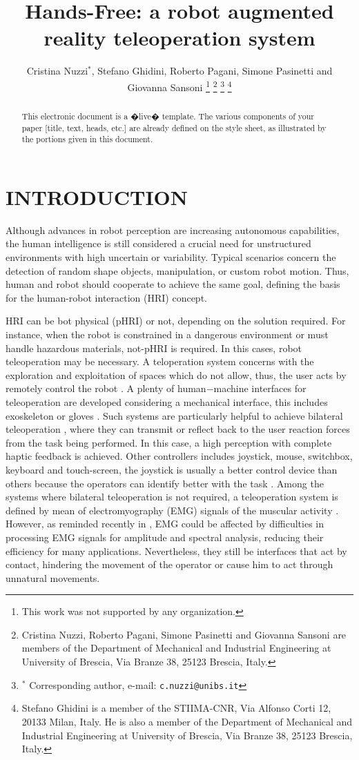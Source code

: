 \documentclass[letterpaper, 10 pt, conference]{ieeeconf}  %
\title{\LARGE \bf
Hands-Free: a robot augmented reality teleoperation system
}
\author{Cristina Nuzzi$^{*}$, Stefano Ghidini, Roberto Pagani, Simone Pasinetti and Giovanna Sansoni %
\thanks{This work was not supported by any organization.}%
\thanks{Cristina Nuzzi, Roberto Pagani, Simone Pasinetti and Giovanna Sansoni are members of the Department of Mechanical and Industrial Engineering at University of Brescia, Via Branze 38, 25123 Brescia, Italy.}
\thanks{$^{*}$ Corresponding author, e-mail: {\tt\small c.nuzzi@unibs.it}}%
\thanks{Stefano Ghidini is a member of the STIIMA-CNR, Via Alfonso Corti 12, 20133 Milan, Italy. He is also a member of the Department of Mechanical and Industrial Engineering at University of Brescia, Via Branze 38, 25123 Brescia, Italy.}
}
\begin{document}
\maketitle
\thispagestyle{empty}
\pagestyle{empty}

\begin{abstract}

This electronic document is a �live� template. The various components of your paper [title, text, heads, etc.] are already defined on the style sheet, as illustrated by the portions given in this document.

\end{abstract}


\section{INTRODUCTION}
Although advances in robot perception are increasing autonomous capabilities, the human intelligence is still considered a crucial need for unstructured environments with high uncertain or variability. Typical scenarios concern the detection of random shape objects, manipulation, or custom robot motion. Thus, human and robot should cooperate to achieve the same goal, defining the basis for the human-robot interaction (HRI) concept.

HRI can be bot physical (pHRI) or not, depending on the solution required. For instance, when the robot is constrained in a dangerous environment or must handle hazardous materials, not-pHRI is required. In this cases, robot teleoperation may be necessary. A teloperation system concerns with the exploration and exploitation of spaces which do not allow, thus, the user acts by remotely control the robot \cite{VERTUTJean;COEFFET}. A plenty of human$-$machine interfaces for teleoperation are developed considering a mechanical interface, this includes exoskeleton \cite{Rebelo2014} or gloves \cite{Lv2006}. Such systems are particularly helpful to achieve bilateral teleoperation \cite{Hokayem2006}, where they can transmit or reflect back to the user reaction forces from the task being performed. In this case, a high perception with complete haptic feedback \cite{Glover2009} is achieved. Other controllers includes joystick,  mouse,  switchbox, keyboard and touch-screen, the joystick is usually a better control device than others because the operators can identify better with the task \cite{Boboc2012}. Among the systems where bilateral teleoperation is not required, a teleoperation system is defined by mean of electromyography (EMG) signals of the muscular activity \cite{Vogel2011,Hassan2019}. However, as reminded recently in \cite{Roveda2018a}, EMG could be affected by difficulties in processing EMG signals for amplitude and spectral analysis, reducing their efficiency for many applications. Nevertheless, they still be interfaces that act by contact, hindering the movement of the operator or cause him to act through unnatural movements.
\end{document}
